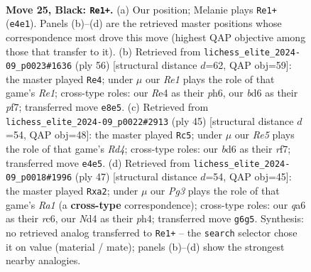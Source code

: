 \documentclass[11pt]{article}
\begin{document}
\clearpage

\begin{figure}[p]\centering
\begin{subfigure}{0.46\textwidth}\centering
\resizebox{\linewidth}{!}{%
\newchessgame
\chessboard[
  setfen={4r1k1/p4p1p/Q2B2p1/8/3nr3/P4q1P/5P2/R5K1 b - - 0 25},
  showmover=false,
  pgfstyle=straightmove, color=movearrow, markmove={e4-e1}
]}
\caption{}
\end{subfigure}\hfill
\begin{subfigure}{0.46\textwidth}\centering
\resizebox{\linewidth}{!}{%
\newchessgame
\chessboard[
  setfen={3r2k1/5pp1/4p2p/4Q3/2qP4/7P/5PP1/4R1K1 w - - 3 29},
  showmover=false,
  pgfstyle=straightmove, color=movearrow, markmove={e1-e4}
]}
\caption{}
\end{subfigure}
\\[4pt]
\begin{subfigure}{0.46\textwidth}\centering
\resizebox{\linewidth}{!}{%
\newchessgame
\chessboard[
  setfen={k2r4/1p3R2/p7/3r4/3q2p1/6Q1/PP3PP1/2R2K2 b - - 0 23},
  showmover=false,
  pgfstyle=straightmove, color=movearrow, markmove={d5-c5}
]}
\caption{}
\end{subfigure}\hfill
\begin{subfigure}{0.46\textwidth}\centering
\resizebox{\linewidth}{!}{%
\newchessgame
\chessboard[
  setfen={r4rk1/6p1/1pR5/3p1p1Q/7P/6P1/Pq3P2/5RK1 b - - 0 24},
  showmover=false,
  pgfstyle=straightmove, color=movearrow, markmove={a8-a2}
]}
\caption{}
\end{subfigure}
\caption{\textbf{Move 25, Black: \texttt{Re1+}.} (a) Our position; Melanie plays \texttt{Re1+} (\texttt{e4e1}). Panels (b)--(d) are the retrieved master positions whose correspondence most drove this move (highest QAP objective among those that transfer to it). (b) Retrieved from \texttt{lichess\_elite\_2024-09\_p0023\#1636} (ply 56) [structural distance $d$=62, QAP obj=59]: the master played \texttt{Re4}; under $\mu$ our \emph{Re1} plays the role of that game's \emph{Re1}; cross-type roles: our \emph{R}e4 as their \emph{p}h6, our \emph{b}d6 as their \emph{p}f7; transferred move \texttt{e8e5}. (c) Retrieved from \texttt{lichess\_elite\_2024-09\_p0022\#2913} (ply 45) [structural distance $d$=54, QAP obj=48]: the master played \texttt{Rc5}; under $\mu$ our \emph{Re5} plays the role of that game's \emph{Rd4}; cross-type roles: our \emph{b}d6 as their \emph{r}f7; transferred move \texttt{e4e5}. (d) Retrieved from \texttt{lichess\_elite\_2024-09\_p0018\#1996} (ply 47) [structural distance $d$=54, QAP obj=45]: the master played \texttt{Rxa2}; under $\mu$ our \emph{Pg3} plays the role of that game's \emph{Ra1} (a \textbf{cross-type} correspondence); cross-type roles: our \emph{q}a6 as their \emph{r}c6, our \emph{N}d4 as their \emph{p}h4; transferred move \texttt{g6g5}. Synthesis: no retrieved analog transferred to \texttt{Re1+} -- the \texttt{search} selector chose it on value (material / mate); panels (b)--(d) show the strongest nearby analogies.}
\label{fig:thought-m49}
\end{figure}
\end{document}
